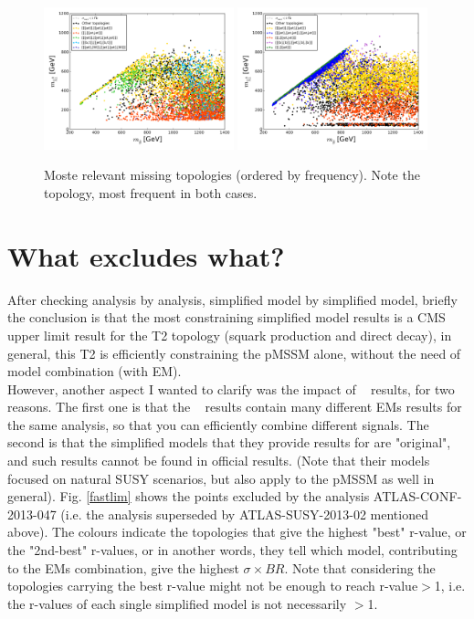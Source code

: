 \documentclass[a4paper,11pt]{article}
\begin{document}
\begin{figure}[!b]
	\centering
	\subfigure
	{ \includegraphics[width=0.49\textwidth]{Fig/SMO_Paper/MissingTopo_HiggsinoLSP.png}}
	\subfigure
	{\includegraphics[width=0.49\textwidth]{Fig/SMO_Paper/MissingTopo_BinoLSP.png}}
	\caption{Moste relevant missing topologies (ordered by frequency). Note the \jmet~ topology, most frequent in both cases.}
	\label{smo_paper_missing}
\end{figure}


\clearpage
\section{What excludes what?}\label{ATLAS047}
After checking analysis by analysis, simplified model by simplified model, briefly the conclusion is that the most constraining simplified model results is a CMS upper limit result for the T2 topology (squark production and direct decay), in general, this T2 is efficiently constraining the pMSSM alone, without the need of model combination (with EM). 
\\

However, another aspect I wanted to clarify was the impact of \FastLim~ results, for two reasons. The first one is that the \FastLim~ results contain many different EMs results for the same analysis, so that you can efficiently combine different signals. The second is that the simplified models that they provide results for are "original", and such results cannot be found in official results. (Note that their models focused on natural SUSY scenarios, but also apply to the pMSSM as well in general).
Fig. \ref{fastlim} shows the points excluded by the analysis ATLAS-CONF-2013-047 (i.e. the analysis superseded by ATLAS-SUSY-2013-02 mentioned above). The colours indicate the topologies that give the highest "best" r-value, or the "2nd-best" r-values, or in another words, they tell which model, contributing to the EMs combination, give the highest $\sigma \times BR$. Note that considering the topologies carrying the best r-value might not be enough to reach r-value$>$1, i.e. the r-values of each single simplified model is not necessarily $>$1. 
\end{document}
